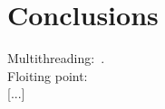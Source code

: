 
\section{Conclusions}
\label{se:conclusions}

Multithreading:~\cite{BGC-OOPSLA14,CLOUD9-EUROSYS11,KPV-TACAS03,GKW-ESEC15,FHR-ESEC13,SA-HVC06}.\\


Floiting point:~\cite{BGM-STVR06}\\



[...]
